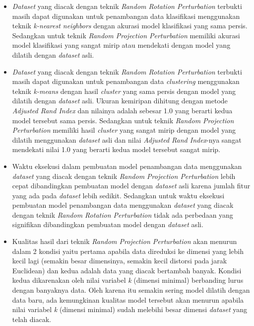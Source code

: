 \begin{itemize}
    \item \textit{Dataset} yang diacak dengan teknik \textit{Random Rotation Perturbation} terbukti masih dapat digunakan untuk penambangan data klasifikasi menggunakan teknik \textit{k-nearest neighbors} dengan akurasi model klasifikasi yang sama persis. Sedangkan untuk teknik \textit{Random Projection Perturbation} memiliki akurasi model klasifikasi yang sangat mirip atau mendekati dengan model yang dilatih dengan \textit{dataset} asli.
    \item \textit{Dataset} yang diacak dengan teknik \textit{Random Rotation Perturbation} terbukti masih dapat digunakan untuk penambangan data \textit{clustering} menggunakan teknik \textit{k-means} dengan hasil \textit{cluster} yang sama persis dengan model yang dilatih dengan \textit{dataset} asli. Ukuran kemiripan dihitung dengan metode \textit{Adjusted Rand Index} dan nilainya adalah sebesar 1.0 yang berarti kedua model tersebut sama persis. Sedangkan untuk teknik \textit{Random Projection Perturbation} memiliki hasil \textit{cluster} yang sangat mirip dengan model yang dilatih menggunakan \textit{dataset} asli dan nilai \textit{Adjusted Rand Index}-nya sangat mendekati nilai 1.0 yang berarti kedua model tersebut sangat mirip.
    \item Waktu eksekusi dalam pembuatan model penambangan data menggunakan \textit{dataset} yang diacak dengan teknik \textit{Random Projection Perturbation} lebih cepat dibandingkan pembuatan model dengan \textit{dataset} asli karena jumlah fitur yang ada pada \textit{dataset} lebih sedikit. Sedangkan untuk waktu eksekusi pembuatan model penambangan data menggunakan \textit{dataset} yang diacak dengan teknik \textit{Random Rotation Perturbation} tidak ada perbedaan yang signifikan dibandingkan pembuatan model dengan \textit{dataset} asli.
    \item Kualitas hasil dari teknik \textit{Random Projection Perturbation} akan menurun dalam 2 kondisi yaitu pertama apabila data direduksi ke dimensi yang lebih kecil lagi (semakin besar dimensinya, semakin kecil distorsi pada jarak Euclidean) dan kedua adalah data yang diacak bertambah banyak. Kondisi kedua dikarenakan oleh nilai variabel \textit{k} (dimensi minimal) berbanding lurus dengan banyaknya data. Oleh karena itu semakin sering model dilatih dengan data baru, ada kemungkinan kualitas model tersebut akan menurun apabila nilai variabel \textit{k} (dimensi minimal) sudah melebihi besar dimensi \textit{dataset} yang telah diacak.
\end{itemize}

